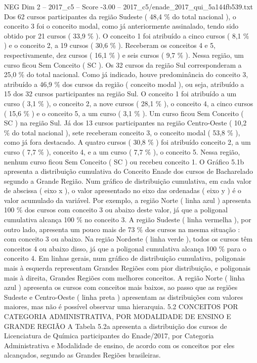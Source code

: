 \begin{textsample}{NEG Dim 2 – 2017\_c5 – Score -3.00 – 2017\_c5/enade\_2017\_qui\_5a144fb539.txt}
Dos 62 cursos participantes da região Sudeste ( 48,4 \% do total nacional ), o conceito 3 foi o conceito modal, como já anteriormente assinalado, tendo sido obtido por 21 cursos ( 33,9 \% ).
O conceito 1 foi atribuído a cinco cursos ( 8,1 \% ) e o conceito 2, a 19 cursos ( 30,6 \% ).
Receberam os conceitos 4 e 5, respectivamente, dez cursos ( 16,1 \% ) e seis cursos ( 9,7 \% ).
Nessa região, um curso ficou Sem Conceito ( SC ).
Os 32 cursos da região Sul corresponderam a 25,0 \% do total nacional.
Como já indicado, houve predominância do conceito 3, atribuído a 46,9 \% dos cursos da região ( conceito modal ), ou seja, atribuído a 15 dos 32 cursos participantes na região Sul.
O conceito 1 foi atribuído a um curso ( 3,1 \% ), o conceito 2, a nove cursos ( 28,1 \% ), o conceito 4, a cinco cursos ( 15,6 \% ) e o conceito 5, a um curso ( 3,1 \% ).
Um curso ficou Sem Conceito ( SC ) na região Sul.
Já dos 13 cursos participantes na região Centro-Oeste ( 10,2 \% do total nacional ), sete receberam conceito 3, o conceito modal ( 53,8 \% ), como já fora destacado.
A quatro cursos ( 30,8 \% ) foi atribuído conceito 2, a um curso ( 7,7 \% ), conceito 4, e a um curso ( 7,7 \% ), o conceito 5.
Nessa região, nenhum curso ficou Sem Conceito ( SC ) ou recebeu conceito 1.
O Gráfico 5.1b apresenta a distribuição cumulativa do Conceito Enade dos cursos de Bacharelado segundo a Grande Região.
Num gráfico de distribuição cumulativa, em cada valor de abscissa ( eixo x ), o valor apresentado no eixo das ordenadas ( eixo y ) é o valor acumulado da variável.
Por exemplo, a região Norte ( linha azul ) apresenta 100 \% dos cursos com conceito 3 ou abaixo deste valor, já que a poligonal cumulativa alcança 100 \% no conceito 3.
A região Sudeste ( linha vermelha ), por outro lado, apresenta um pouco mais de 73 \% dos cursos na mesma situação : com conceito 3 ou abaixo.
Na região Nordeste ( linha verde ), todos os cursos têm conceitos 4 ou abaixo disso, já que a poligonal cumulativa alcança 100 \% para o conceito 4.
Em linhas gerais, num gráfico de distribuição cumulativa, poligonais mais à esquerda representam Grandes Regiões com pior distribuição, e poligonais mais à direita, Grandes Regiões com melhores conceitos.
A região Norte ( linha azul ) apresenta os cursos com conceitos mais baixos, ao passo que as regiões Sudeste e Centro-Oeste ( linha preta ) apresentam as distribuições com valores maiores, mas não é possível observar uma hierarquia. 5.2 CONCEITOS POR CATEGORIA ADMINISTRATIVA, POR MODALIDADE DE ENSINO E GRANDE REGIÃO A Tabela 5.2a apresenta a distribuição dos cursos de Licenciatura de Química participantes do Enade/2017, por Categoria Administrativa e Modalidade de ensino, de acordo com os conceitos por eles alcançados, segundo as Grandes Regiões brasileiras.

\end{textsample}
